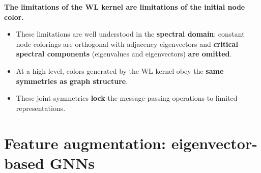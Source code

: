 \begin{keyidea}
  \textbf{The limitations of the WL kernel are limitations of the initial node
  color.}
  \begin{itemize}
    \item These limitations are well understood in the \textbf{spectral domain}:
      constant node colorings are orthogonal with adjacency eigenvectors and
      \textbf{critical spectral components} (eigenvalues and eigenvectors)
      \textbf{are omitted}.
    \item At a high level, colors generated by the WL kernel obey the \textbf{same
      symmetries as graph structure}.
    \item These joint symmetries \textbf{lock} the message-passing operations to
      limited representations.
  \end{itemize}
\end{keyidea}

\section{Feature augmentation: eigenvector-based GNNs}\label{sec:lec07-eigfeat}

